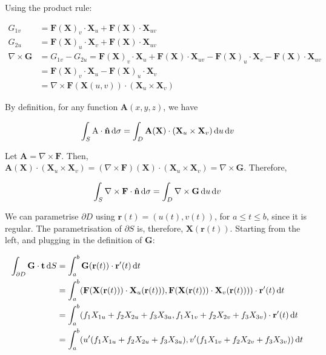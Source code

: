 Using the product rule:

\begin{align*}
  G_{1v} &= \mathbf{F}(\mathbf{X})_v \cdot \mathbf{X}_u + \mathbf{F}(\mathbf{X}) \cdot \mathbf{X}_{uv} \\
  G_{2u} &= \mathbf{F}(\mathbf{X})_u \cdot \mathbf{X}_v + \mathbf{F}(\mathbf{X}) \cdot \mathbf{X}_{uv} \\
  \nabla \times \mathbf{G} &= G_{1v} - G_{2u} = \mathbf{F}(\mathbf{X})_v \cdot \mathbf{X}_u + \mathbf{F}(\mathbf{X}) \cdot \mathbf{X}_{uv} - \mathbf{F}(\mathbf{X})_u \cdot \mathbf{X}_v - \mathbf{F}(\mathbf{X}) \cdot \mathbf{X}_{uv} \\
  &= \mathbf{F}(\mathbf{X})_v \cdot \mathbf{X}_u - \mathbf{F}(\mathbf{X})_u \cdot \mathbf{X}_v \\
  &= \nabla \times \mathbf{F}(\mathbf{X}(u, v)) \cdot (\mathbf{X}_u \times \mathbf{X}_v)
\end{align*}

By definition, for any function $\mathbf{A}(x, y, z)$, we have

\begin{align*}
  \int_S \mathrm{A} \cdot \mathbf{\hat{n}} \mathop{}\!\mathrm{d} \sigma = \int_D \mathbf{A}(\mathbf{X}) \cdot (\mathbf{X}_u \times \mathbf{X}_v) \mathop{}\!\mathrm{d} u \mathop{}\!\mathrm{d} v \\
\end{align*}

Let $\mathbf{A} = \nabla \times \mathbf{F}$. Then, $\mathbf{A}(\mathbf{X}) \cdot (\mathbf{X}_u \times \mathbf{X}_v) = (\nabla \times \mathbf{F})(\mathbf{X}) \cdot (\mathbf{X}_u \times \mathbf{X}_v) = \nabla \times \mathbf{G}$. Therefore,

\begin{align*}
  \int_S \nabla \times \mathbf{F} \cdot \mathbf{\hat{n}} \mathop{}\!\mathrm{d} \sigma = \int_D \nabla \times \mathbf{G} \mathop{}\!\mathrm{d} u \mathop{}\!\mathrm{d} v \\
\end{align*}

We can parametrise $\partial D$ using $\mathbf{r}(t) = (u(t), v(t))$, for $a \leq t \leq b$, since it is regular. The parametrisation of $\partial S$ is, therefore, $\mathbf{X}(\mathbf{r}(t))$. Starting from the left, and plugging in the definition of $\mathbf{G}$:

\begin{align*}
  \int_{\partial D} \mathbf{G} \cdot \mathbf{t} \mathop{}\!\mathrm{d} S &= \int_a^b \mathbf{G}(\mathbf{r}(t)) \cdot \mathbf{r}^{\prime}(t) \mathop{}\!\mathrm{d} t \\
  &= \int_a^b (\mathbf{F}(\mathbf{X}(\mathbf{r}(t))) \cdot \mathbf{X}_u(\mathbf{r}(t))), \mathbf{F}(\mathbf{X}(\mathbf{r}(t))) \cdot \mathbf{X}_v(\mathbf{r}(t)))) \cdot \mathbf{r}^{\prime}(t) \mathop{}\!\mathrm{d} t \\
  &= \int_a^b (f_1X_{1u} + f_2X_{2u} + f_3X_{3u}, f_1X_{1v} + f_2X_{2v} + f_3X_{3v}) \cdot \mathbf{r}^{\prime}(t) \mathop{}\!\mathrm{d} t \\
  &= \int_a^b (u^{\prime}(f_1X_{1u} + f_2X_{2u} + f_3X_{3u}), v^{\prime}(f_1X_{1v} + f_2X_{2v} + f_3X_{3v})) \mathop{}\!\mathrm{d} t
\end{align*}

